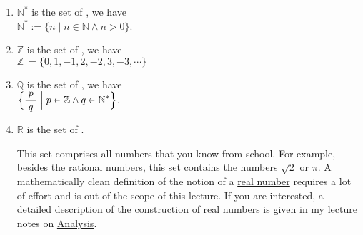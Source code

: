 \begin{enumerate}
\item $\mathbb{N}^*$ is the set of ,  we have
      \\[0.2cm]
      \hspace*{1.3cm}
      $\mathbb{N}^* := \{ n \mid n \in \mathbb{N} \wedge n > 0 \}$.
\item $\mathbb{Z}$ is the set of , we have
      \\[0.2cm]
      \hspace*{1.3cm}
      $\mathbb{Z} \ = \{ 0, 1, -1, 2, -2, 3, -3, \cdots \}$ 

\item $\mathbb{Q}$ is the set of , we have
      \\[0.2cm]
      \hspace*{1.3cm}
      $\Bigl\{ \displaystyle\frac{\;p\;}{q} \Bigm| p \in \mathbb{Z} \wedge q \in \mathbb{N}^* \Bigr\}$.
\item $\mathbb{R}$ is the set of .  

      This set comprises all numbers that you know from school.  For example, besides the rational numbers,
      this set contains the numbers $\sqrt{2}$ or $\pi$.
      A mathematically clean definition of the notion of a \href{https://en.wikipedia.org/wiki/Real_number}{real number}
      requires a lot of effort and is out of the scope of this lecture.  If you are interested, a detailed
      description of the construction of real numbers is given in my lecture notes on 
      \href{https://github.com/karlstroetmann/Analysis/blob/master/Skript/analysis.pdf}{Analysis}.
\end{enumerate}

